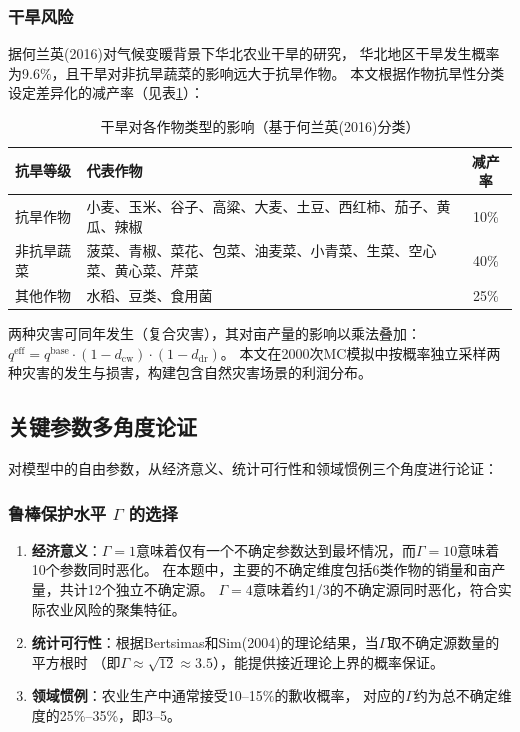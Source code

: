 \documentclass[12pt]{ctexart}
\begin{document}
\subsubsection{干旱风险}

据何兰英(2016)对气候变暖背景下华北农业干旱的研究\cite{he2016}，
华北地区干旱发生概率为9.6\%，且干旱对非抗旱蔬菜的影响远大于抗旱作物。
本文根据作物抗旱性分类设定差异化的减产率（见表\ref{tab:drought}）：

\begin{table}[H]
\centering
\caption{干旱对各作物类型的影响（基于何兰英(2016)分类）}
\label{tab:drought}
\begin{tabular}{@{}lp{7.5cm}c@{}}
\toprule
\textbf{抗旱等级} & \textbf{代表作物} & \textbf{减产率} \\
\midrule
抗旱作物 & 小麦、玉米、谷子、高粱、大麦、土豆、西红柿、茄子、黄瓜、辣椒 & 10\% \\
非抗旱蔬菜 & 菠菜、青椒、菜花、包菜、油麦菜、小青菜、生菜、空心菜、黄心菜、芹菜 & 40\% \\
其他作物 & 水稻、豆类、食用菌 & 25\% \\
\bottomrule
\end{tabular}
\end{table}

两种灾害可同年发生（复合灾害），其对亩产量的影响以乘法叠加：
$q^{\text{eff}} = q^{\text{base}} \cdot (1 - d_{\text{cw}}) \cdot (1 - d_{\text{dr}})$。
本文在2000次MC模拟中按概率独立采样两种灾害的发生与损害，构建包含自然灾害场景的利润分布。

\subsection{关键参数多角度论证}

对模型中的自由参数，从经济意义、统计可行性和领域惯例三个角度进行论证：

\subsubsection{\texorpdfstring{鲁棒保护水平 $\Gamma$ 的选择}{鲁棒保护水平 Gamma 的选择}}

\begin{enumerate}[label=(\arabic*), leftmargin=*]
    \item \textbf{经济意义}：$\Gamma=1$意味着仅有一个不确定参数达到最坏情况，而$\Gamma=10$意味着10个参数同时恶化。
          在本题中，主要的不确定维度包括6类作物的销量和亩产量，共计12个独立不确定源。
          $\Gamma=4$意味着约1/3的不确定源同时恶化，符合实际农业风险的聚集特征。
    \item \textbf{统计可行性}：根据Bertsimas和Sim(2004)的理论结果，当$\Gamma$取不确定源数量的平方根时
          （即$\Gamma \approx \sqrt{12} \approx 3.5$），能提供接近理论上界的概率保证。
    \item \textbf{领域惯例}：农业生产中通常接受10--15\%的歉收概率，
          对应的$\Gamma$约为总不确定维度的25\%--35\%，即3--5。
\end{enumerate}
\end{document}
